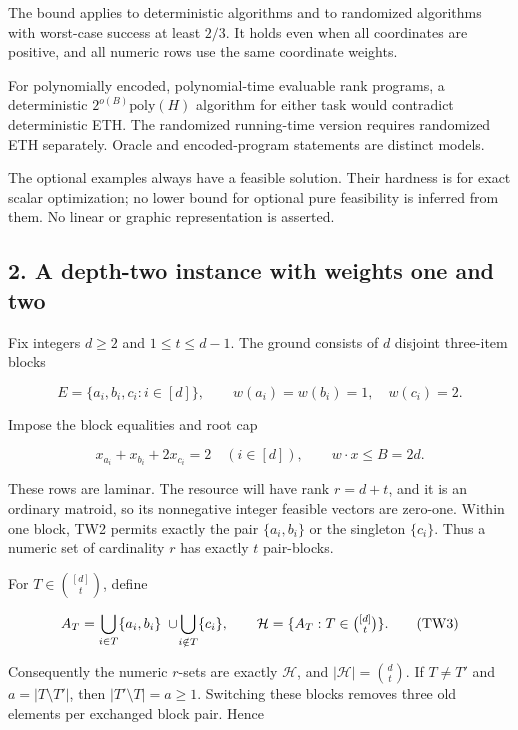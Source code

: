 The bound applies to deterministic algorithms and to randomized algorithms with worst-case success at least \(2/3\). It holds even when all coordinates are positive, and all numeric rows use the same coordinate weights.

For polynomially encoded, polynomial-time evaluable rank programs, a deterministic \(2^{o(B)}\mathrm{poly}(H)\) algorithm for either task would contradict deterministic ETH. The randomized running-time version requires randomized ETH separately. Oracle and encoded-program statements are distinct models.

The optional examples always have a feasible solution. Their hardness is for exact scalar optimization; no lower bound for optional pure feasibility is inferred from them. No linear or graphic representation is asserted.

\hypertarget{af-e9b108715f-a-depth-two-instance-with-weights-one-and-two}{%
\subsection{2. A depth-two instance with weights one and two}\label{af-e9b108715f-a-depth-two-instance-with-weights-one-and-two}}

Fix integers \(d\ge2\) and \(1\le t\le d-1\). The ground consists of \(d\) disjoint three-item blocks

\[
E=\{a_i,b_i,c_i:i\in[d]\},
\qquad w(a_i)=w(b_i)=1,\quad w(c_i)=2.
\tag{TW1}
\]

Impose the block equalities and root cap

\[
x_{a_i}+x_{b_i}+2x_{c_i}=2\quad(i\in[d]),
\qquad w\cdot x\le B=2d.
\tag{TW2}
\]

These rows are laminar. The resource will have rank \(r=d+t\), and it is an ordinary matroid, so its nonnegative integer feasible vectors are zero-one. Within one block, TW2 permits exactly the pair \(\{a_i,b_i\}\) or the singleton \(\{c_i\}\). Thus a numeric set of cardinality \(r\) has exactly \(t\) pair-blocks.

For \(T\in\binom{[d]}t\), define

\[
A_T=\bigcup_{i\in T}\{a_i,b_i\}
\;\cup\!\bigcup_{i\notin T}\{c_i\},
\qquad
\mathcal H=\{A_T:T\in\tbinom{[d]}t\}.
\tag{TW3}
\]

Consequently the numeric \(r\)-sets are exactly \(\mathcal H\), and \(|\mathcal H|=\binom dt\). If \(T\ne T'\) and \(a=|T\setminus T'|\), then \(|T'\setminus T|=a\ge1\). Switching these blocks removes three old elements per exchanged block pair. Hence


